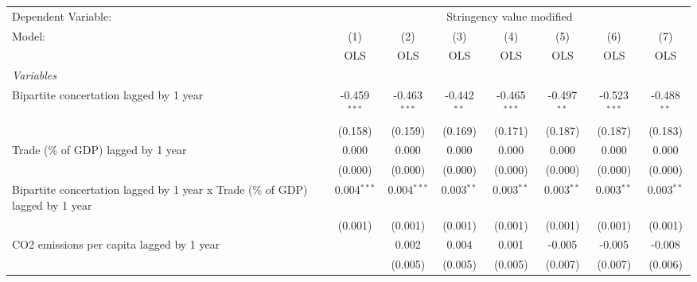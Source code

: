 
\begingroup
\centering
\begin{tabular}{lccccccc}
   \toprule
   Dependent Variable: & \multicolumn{7}{c}{Stringency value modified}\\
   Model:                                                                        & (1)            & (2)            & (3)           & (4)            & (5)           & (6)            & (7)\\  
                                                                                 &  OLS           & OLS            & OLS           & OLS            & OLS           & OLS            & OLS\\  
   \midrule
   \emph{Variables}\\
   Bipartite concertation lagged by 1 year                                       & -0.459$^{***}$ & -0.463$^{***}$ & -0.442$^{**}$ & -0.465$^{***}$ & -0.497$^{**}$ & -0.523$^{***}$ & -0.488$^{**}$\\   
                                                                                 & (0.158)        & (0.159)        & (0.169)       & (0.171)        & (0.187)       & (0.187)        & (0.183)\\   
   Trade (\% of GDP) lagged by 1 year                                            & 0.000          & 0.000          & 0.000         & 0.000          & 0.000         & 0.000          & 0.000\\   
                                                                                 & (0.000)        & (0.000)        & (0.000)       & (0.000)        & (0.000)       & (0.000)        & (0.000)\\   
   Bipartite concertation lagged by 1 year x Trade (\% of GDP) lagged by 1 year  & 0.004$^{***}$  & 0.004$^{***}$  & 0.003$^{**}$  & 0.003$^{**}$   & 0.003$^{**}$  & 0.003$^{**}$   & 0.003$^{**}$\\   
                                                                                 & (0.001)        & (0.001)        & (0.001)       & (0.001)        & (0.001)       & (0.001)        & (0.001)\\   
   CO2 emissions per capita lagged by 1 year                                     &                & 0.002          & 0.004         & 0.001          & -0.005        & -0.005         & -0.008\\   
                                                                                 &                & (0.005)        & (0.005)       & (0.005)        & (0.007)       & (0.007)        & (0.006)\\   

\end{tabular}
